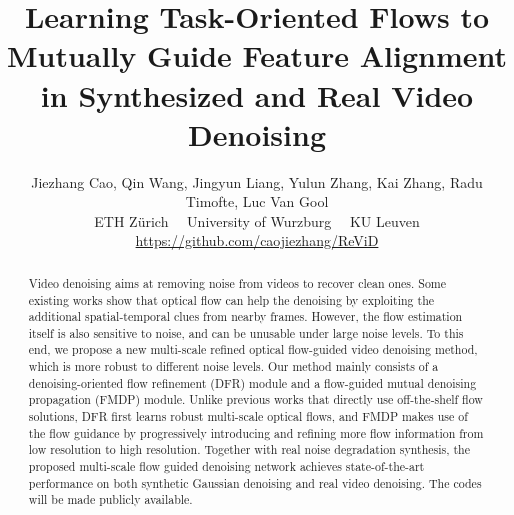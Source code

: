\documentclass[10pt,twocolumn,letterpaper]{article}
\newlength \g
\begin{document}
\title{Learning Task-Oriented Flows to Mutually Guide Feature Alignment in Synthesized and Real Video Denoising}


\author{Jiezhang Cao, Qin Wang, Jingyun Liang, Yulun Zhang, Kai Zhang, Radu Timofte, Luc Van Gool\\
  ETH Z\"urich \quad~~University of Wurzburg  \quad~~KU Leuven \\
\url{https://github.com/caojiezhang/ReViD}\\
}

\maketitle
\ificcvfinal\thispagestyle{empty}\fi


\begin{abstract}


Video denoising aims at removing noise from videos to recover clean ones. Some existing works show that optical flow can help the denoising by exploiting the additional spatial-temporal clues from nearby frames. However, the flow estimation itself is also sensitive to noise, and can be unusable under large noise levels. To this end, we propose a new multi-scale refined optical flow-guided video denoising method, which is more robust to different noise levels. 
Our method mainly consists of a denoising-oriented flow refinement (DFR) module and a flow-guided mutual denoising propagation (FMDP) module. Unlike previous works that directly use off-the-shelf flow solutions, DFR first learns robust multi-scale optical flows, and FMDP makes use of the flow guidance by progressively introducing and refining more flow information from low resolution to high resolution. Together with real noise degradation synthesis, the proposed multi-scale flow guided denoising network achieves state-of-the-art performance on both synthetic Gaussian denoising and real video denoising. The codes will be made publicly available.

\end{abstract}



\vspace{-3mm}
\end{document}
